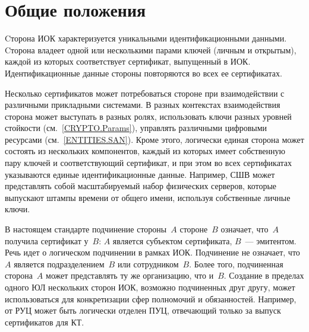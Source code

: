\section{Общие положения}\label{ENTITIES.Common}

Cторона ИОК характеризуется уникальными идентификационными данными.
%
Cторона владеет одной или несколькими парами ключей (личным и открытым),
каждой из которых соответствует сертификат, выпущенный в ИОК. 
%
Идентификационные данные стороны повторяются во всех ее сертификатах.

Несколько сертификатов может потребоваться стороне при взаимодействии 
с различными прикладными системами. В разных контекстах взаимодействия
сторона может выступать в разных ролях, 
использовать ключи разных уровней стойкости (см.~\ref{CRYPTO.Params}), 
управлять различными цифровыми ресурсами (см.~\ref{ENTITIES.SAN}). 
%
Кроме этого, логически единая сторона может состоять из нескольких 
компонентов, каждый из которых имеет собственную пару ключей 
и соответствующий сертификат, и при этом во всех сертификатах указываются 
единые идентификационные данные.
%
Например, СШВ может представлять собой масштабируемый набор физических серверов, 
которые выпускают штампы времени от общего имени, используя собственные личные ключи.

В настоящем стандарте
подчинение стороны~$A$ стороне~$B$ означает, что~$A$ получила сертификат 
у~$B$: $A$ является субъектом сертификата, $B$~--- эмитентом.
%
Речь идет о логическом подчинении в рамках ИОК.
Подчинение не означает, что~$A$ является подразделением~$B$ или сотрудником~$B$. 
Более того, подчиненная сторона~$A$ может представлять ту же организацию, 
что и~$B$.
%
Создание в пределах одного ЮЛ нескольких сторон ИОК, 
возможно подчиненных друг другу, может использоваться для конкретизации 
сфер полномочий и обязанностей.
%
Например, от РУЦ может быть логически отделен ПУЦ, 
отвечающий только за выпуск сертификатов для КТ.
